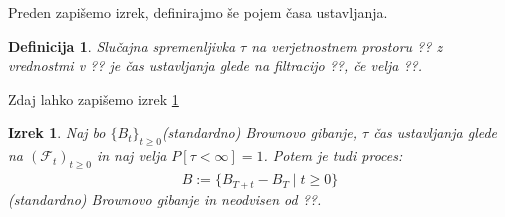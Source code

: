 \documentclass[11pt]{article}
\newtheorem{izrek}{Izrek}
\newtheorem{definicija}{Definicija}
\begin{document}
    Preden zapišemo izrek, definirajmo še pojem časa ustavljanja.
    
\begin{definicija}
	    Slučajna spremenljivka $\tau$ na verjetnostnem prostoru ?? z vrednostmi v ??
    je čas ustavljanja glede na filtracijo ??, če velja ??.
\end{definicija}
    
	Zdaj lahko zapišemo izrek \ref{thm:stopped_brownian} %
    
\begin{izrek}
	Naj bo $\{B_t\}_{t \geq 0}$\label{thm:stopped_brownian} (standardno) Brownovo gibanje, $\tau$ čas ustavljanja glede na 
    $(\mathcal{F}_t)_{t \geq 0}$ in naj velja $P[\tau<\infty]=1$.
    Potem je tudi proces:
    \[
    \hat{B} := \{B_{T+t} - B_T \mid t \geq 0\}
    \]
    (standardno) Brownovo gibanje in neodvisen od ??.
\end{izrek}



\end{document}
